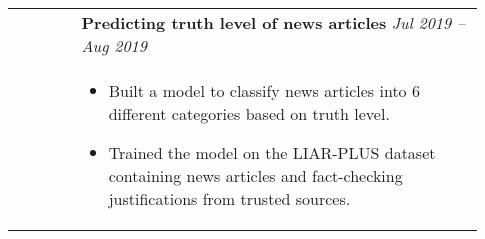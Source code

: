 \documentclass[letterpaper, 10pt, oneside]{article}
\newcommand{\bdit}[1]{{\textbf{#1}}}
\begin{document}
\begin{longtable}{@{} p{0.13\linewidth} p{0.8\linewidth}}
                         & \bdit{Predicting truth level of news articles} \hfill \textsl{Jul 2019 -- Aug 2019}                                                                                       \\
                         & \parbox{0.8\textwidth}{                                                                                                                                                   %
        \begin{itemize}[leftmargin=*, itemsep=-0.88ex, topsep=0.2ex]
            \item Built a model to classify news articles into 6 different categories based on truth level.
            \item Trained the model on the LIAR-PLUS dataset containing news articles and
                  fact-checking justifications from trusted sources.
        \end{itemize}
    }                                                                                                                                                                                                \\
    \\[-1ex]




\end{longtable}
\end{document}
